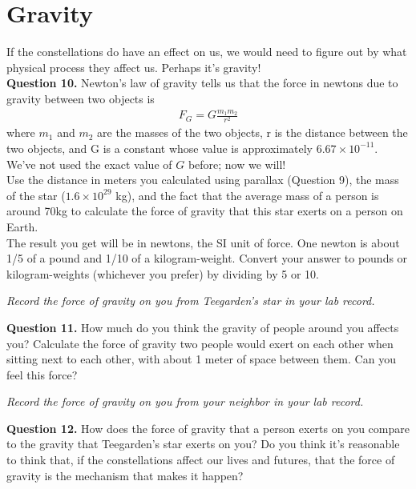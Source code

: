 \documentclass[11pt]{article}
\begin{document}
\section{Gravity}
If the constellations do have an effect on us, we would need to figure out by what physical process they affect us. Perhaps it's gravity!\\

\textbf{Question 10.} Newton's law of gravity tells us that the force in newtons due to gravity between two objects is
\begin{align*}
F_G=G\frac{m_1 m_2}{r^2}
\end{align*}
where $m_1$ and $m_2$ are the masses of the two objects, r is the distance between the two objects, and G is a constant whose value is approximately $6.67\times 10^{-11}$. We've not used the exact value of $G$ before; now we will!\\

Use the distance in meters you calculated using parallax (Question 9), the mass of the star ($1.6\times 10^{29}$ kg), and the fact that the average mass of a person is around 70kg to calculate the force of gravity that this star exerts on a person on Earth.\\

The result you get will be in newtons, the SI unit of force. One newton is about 1/5 of a pound and 1/10 of a kilogram-weight. Convert your answer to pounds or kilogram-weights (whichever you prefer) by dividing by 5 or 10. 

\vspace{1em}

{\it Record the force of gravity on you from Teegarden's star in your lab record.}
\vspace{2em}

\textbf{Question 11.} How much do you think the gravity of people around you affects you? Calculate the force of gravity two people would exert on each other when sitting next to each other, with about 1 meter of space between them. Can you feel this force?
\vspace{1em}

{\it Record the force of gravity on you from your neighbor in your lab record.}
\vspace{2em}

\textbf{Question 12.} How does the force of gravity that a person exerts on you compare to the gravity that Teegarden's star exerts on you? Do you think it's reasonable to think that, if the constellations affect our lives and futures, that the force of gravity is the mechanism that makes it happen? \\
%
\end{document}
